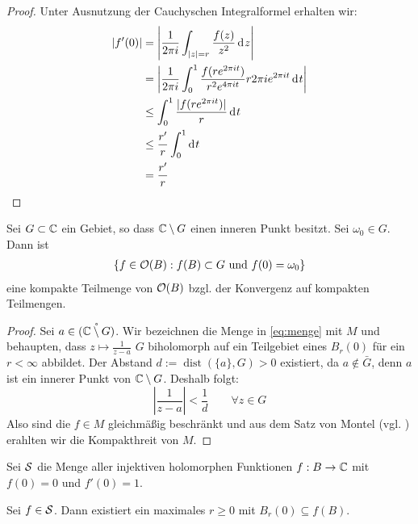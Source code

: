 \begin{proof}
  Unter Ausnutzung der Cauchyschen Integralformel erhalten wir:
  \begin{align*}
    |f'(0)| & = \left | \frac{1}{2\pi i} \int_{|z| = r} \frac{f(z)}{z^2}
      \d[z] \right | \\
    & = \left | \frac{1}{2 \pi i} \int_0^1 \frac{f(r e^{2\pi it})}{r^2
        e^{4\pi i t}} r 2\pi i e^{2\pi i t} \d[t] \right | \\
    & \leq \int_0^1 \frac{|f(r e^{2\pi it})|}{r} \d[t] \\
    & \leq \frac{r'}{r} \int_0^1 \d[t] \\
    & = \frac{r'}{r}
  \end{align*}
\end{proof}

\begin{lemma}
  \label{lemma:funktion-kompakt}
  Sei $G \subset \C$ ein Gebiet, so dass $\C\setminus G$ einen inneren
  Punkt besitzt. Sei $\omega_0 \in G$. Dann ist
  \begin{align}
  \{f \in \hol(B): f(B) \subset G \text{ und } f(0) = \omega_0
  \} \label{eq:menge} 
  \end{align}
  eine kompakte Teilmenge von $\hol(B)$ bzgl. der Konvergenz auf
  kompakten Teilmengen.
\end{lemma}

\begin{proof}
  Sei $a  \in \mathring{(\C \setminus G)}$. Wir bezeichnen die
  Menge in  \eqref{eq:menge} mit $M$ und behaupten, dass $z \mapsto
  \frac{1}{z-a}$ $G$ biholomorph auf ein Teilgebiet eines
  $B_r(0)$ für ein $r < \infty$ abbildet. 
  Der Abstand $d:= \operatorname{dist}(\{a\},G)> 0$ existiert, da $a \notin \bar
  G$, denn $a$ ist ein innerer Punkt von $\C \setminus G$. Deshalb
  folgt:
  \[
  \left | \frac{1}{z-a} \right |< \frac1d \qquad \forall z \in G
  \]
  Also sind die $f \in M$ gleichmäßig beschränkt und aus dem Satz von
  Montel (vgl. \cite[Satz 4.9]{Frei}) erahlten wir die Kompakthreit von $M$.
\end{proof}

\begin{defin}
  Sei $\S$\index{$\S$} die Menge aller injektiven holomorphen Funktionen $f: B \ra
  \C$ mit $f(0) = 0$ und $f'(0)= 1$.
\end{defin}

\begin{lemma}
  \label{lemma:schlicht-max-rad}
  Sei $f \in \S$. Dann existiert ein maximales $r \geq 0$ mit $B_r(0) \subseteq
  f(B)$.
\end{lemma}

